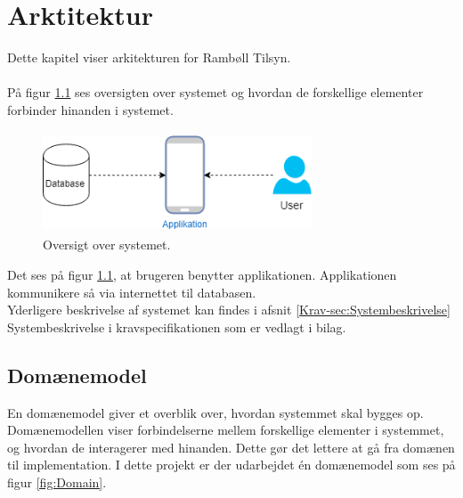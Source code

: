 \chapter{Arktitektur}
Dette kapitel viser arkitekturen for Rambøll Tilsyn. \\ \\
På figur \ref{fig:OversigtSystembeskrivelse} ses oversigten over systemet og hvordan de forskellige elementer forbinder hinanden i systemet.
\begin{figure}[H] %
	\centering
	\includegraphics[height=3cm, width=8cm]{../ArkitekturDesign/OverordnetArkitektur//Oversigtoversystem}
	\caption{Oversigt over systemet.}
	\label{fig:OversigtSystembeskrivelse}
\end{figure}
Det ses på figur \ref{fig:OversigtSystembeskrivelse}, at brugeren benytter applikationen. Applikationen kommunikere så via internettet til databasen. \\
Yderligere beskrivelse af systemet kan findes i afsnit \ref{Krav-sec:Systembeskrivelse} Systembeskrivelse i kravspecifikationen som er vedlagt i bilag.

\clearpage

\section{Domænemodel}
En domænemodel giver et overblik over, hvordan systemmet skal bygges op. Domænemodellen viser forbindelserne mellem forskellige elementer i systemmet, og hvordan de interagerer med hinanden. Dette gør det lettere at gå fra domænen til implementation.
I dette projekt er der udarbejdet én domænemodel som ses på figur \ref{fig:Domain}.

